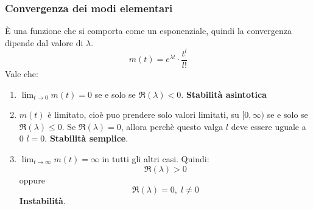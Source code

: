 \documentclass[a4paper]{article}
\begin{document}
\subsubsection{Convergenza dei modi elementari}
È una funzione che si comporta come un esponenziale, quindi la convergenza dipende dal
valore di \( \lambda \).
\[
  m(t) = e^{\lambda t} \cdot \frac{t^l}{l!}
\] 
Vale che:
\begin{enumerate}
  \item \( \lim_{t \to 0} m(t) = 0 \) se e solo se \( \Re(\lambda) < 0 \).
    \textbf{Stabilità asintotica}
    
  \item \( m(t) \) è limitato, cioè puo prendere solo valori limitati, su \( [0,\infty) \) 
    se e solo se \( \Re(\lambda) \le 0 \). Se \( \Re(\lambda) = 0 \), allora perchè
    questo valga \( l \) deve essere uguale a 0 \( l=0 \).
    \textbf{Stabilità semplice}.

  \item \( \lim_{t \to \infty} m(t) = \infty \) in tutti gli altri casi. Quindi:
    \[
      \Re(\lambda) > 0
    \] 
    oppure
    \[
      \Re(\lambda) = 0,\; l \neq 0
    \] 
    \textbf{Instabilità}.
\end{enumerate}
\end{document}
